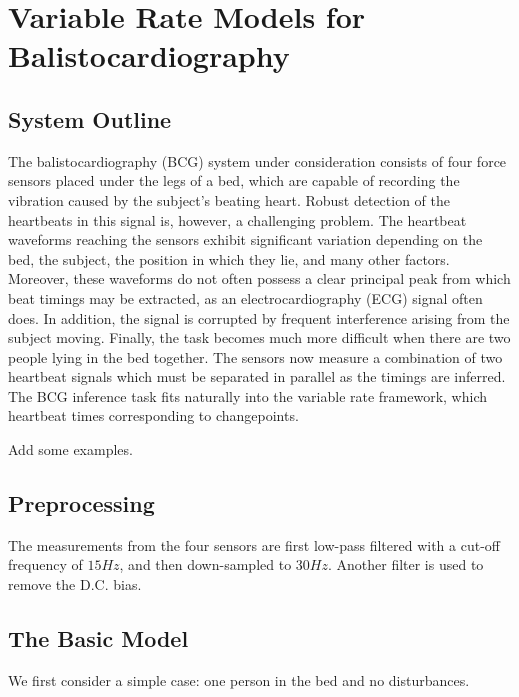 \documentclass{article}
\begin{document}
\section{Variable Rate Models for Balistocardiography}

\subsection{System Outline}

The balistocardiography (BCG) system under consideration consists of four force sensors placed under the legs of a bed, which are capable of recording the vibration caused by the subject's beating heart. Robust detection of the heartbeats in this signal is, however, a challenging problem. The heartbeat waveforms reaching the sensors exhibit significant variation depending on the bed, the subject, the position in which they lie, and many other factors. Moreover, these waveforms do not often possess a clear principal peak from which beat timings may be extracted, as an electrocardiography (ECG) signal often does. In addition, the signal is corrupted by frequent interference arising from the subject moving. Finally, the task becomes much more difficult when there are two people lying in the bed together. The sensors now measure a combination of two heartbeat signals which must be separated in parallel as the timings are inferred. The BCG inference task fits naturally into the variable rate framework, which heartbeat times corresponding to changepoints.

{\meta Add some examples.}

\subsection{Preprocessing}

The measurements from the four sensors are first low-pass filtered with a cut-off frequency of $15Hz$, and then down-sampled to $30Hz$. Another filter is used to remove the D.C. bias.

\subsection{The Basic Model}

We first consider a simple case: one person in the bed and no disturbances.
\end{document}

